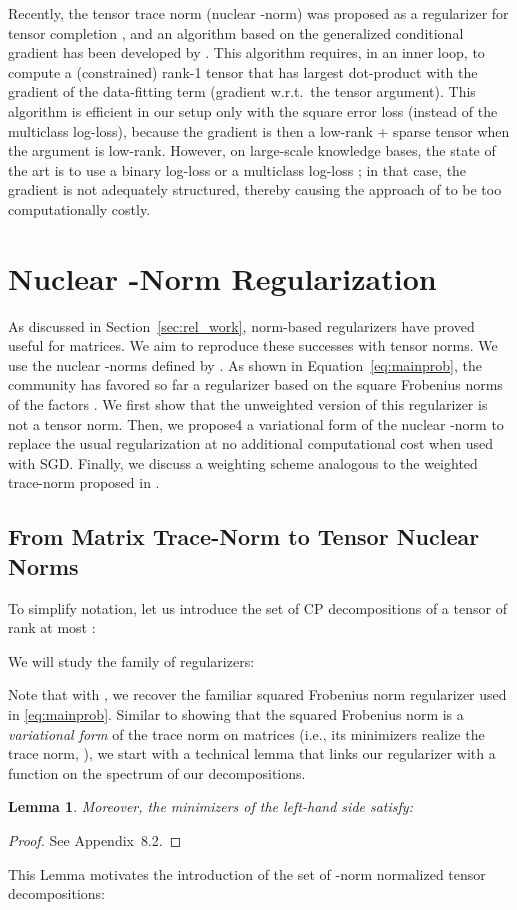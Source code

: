 \documentclass{article}
\newtheorem{lemma}{Lemma}
\newcommand{\CP}{{CP}\xspace}
\begin{document}
Recently, the tensor trace norm (nuclear -norm) was proposed as a regularizer for tensor completion \citet{yuan_tensor_2016}, and an algorithm based on the generalized conditional gradient has been developed by \citet{cheng_scalable_2016}. This algorithm requires, in an inner loop, to compute a (constrained) rank-1 tensor that has largest dot-product with the gradient of the data-fitting term (gradient w.r.t.\ the tensor argument). This algorithm is efficient in our setup only with the square error loss (instead of the multiclass log-loss), because the gradient is then a low-rank + sparse tensor when the argument is low-rank. However, on large-scale knowledge bases, the state of the art is to use a binary log-loss or a multiclass log-loss
\citep{trouillon_complex_2016,kadlec_knowledge_2017}; in that case, the gradient is not adequately structured, thereby causing the approach of \cite{cheng_scalable_2016} to be too computationally costly.

\section{Nuclear -Norm Regularization}
As discussed in Section~\ref{sec:rel_work}, norm-based regularizers have proved useful for matrices. We aim to reproduce these successes with tensor norms. We use the nuclear -norms defined by \citet{friedland_nuclear_2014}. As shown in Equation~\eqref{eq:mainprob}, the community has favored so far a regularizer based on the square Frobenius norms of the factors \citep{yang_embedding_2014, trouillon_complex_2016}. We  first show that the unweighted version of this regularizer is not a tensor norm. Then, we propose4 a variational form of the nuclear -norm to replace the usual regularization at no additional computational cost when used with SGD. Finally, we discuss a weighting scheme analogous to the weighted trace-norm proposed in \citet{srebro_collaborative_2010}.

\subsection{From Matrix Trace-Norm to Tensor Nuclear Norms}
To simplify notation, let us introduce the set of \CP decompositions of a tensor  of rank at most :

We will study the family of regularizers:

Note that with , we recover the familiar squared Frobenius norm regularizer used in \eqref{eq:mainprob}. Similar to showing that the squared Frobenius norm is a \emph{variational form} of the trace norm on matrices (i.e., its minimizers realize the trace norm, ), we start with a technical lemma that links our regularizer with a function on the spectrum of our decompositions. 
\begin{lemma}

Moreover, the minimizers of the left-hand side satisfy: 

\end{lemma}
\begin{proof}
See Appendix~8.2.
\end{proof}
This Lemma motivates the introduction of the set of -norm normalized tensor decompositions:
\end{document}
